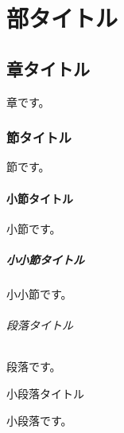 \documentclass{ltjsbook}
\begin{document}
\part{部タイトル}
\chapter{章タイトル}
章です。
\section{節タイトル}
節です。
\subsection{小節タイトル}
小節です。
\subsubsection{小小節タイトル}
小小節です。
\paragraph{段落タイトル}
段落です。
\subparagraph{小段落タイトル}
小段落です。
\end{document}
